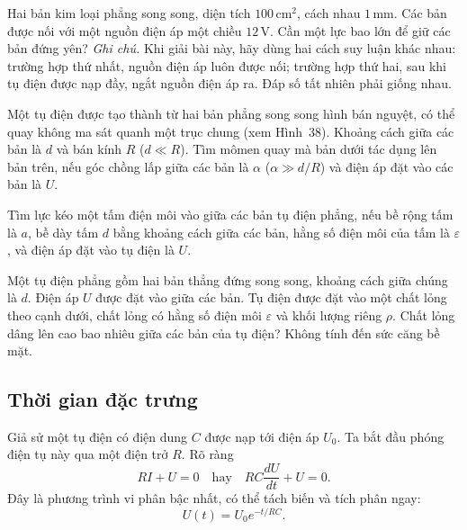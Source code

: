  Hai bản kim loại phẳng song song, diện tích $100\,\mathrm{cm}^2$, cách nhau $1\,\mathrm{mm}$. Các bản được nối với một nguồn điện áp một chiều $12\,\mathrm{V}$. Cần một lực bao lớn để giữ các bản đứng yên? \emph{Ghi chú.} Khi giải bài này, hãy dùng hai cách suy luận khác nhau: trường hợp thứ nhất, nguồn điện áp luôn được nối; trường hợp thứ hai, sau khi tụ điện được nạp đầy, ngắt nguồn điện áp ra. Đáp số tất nhiên phải giống nhau.


 Một tụ điện được tạo thành từ hai bản phẳng song song hình bán nguyệt, có thể quay không ma sát quanh một trục chung (xem Hình~38). Khoảng cách giữa các bản là $d$ và bán kính $R$ ($d \ll R$). Tìm mômen quay mà bản dưới tác dụng lên bản trên, nếu góc chồng lấp giữa các bản là $\alpha$ ($\alpha \gg d/R$) và điện áp đặt vào các bản là $U$.


 Tìm lực kéo một tấm điện môi vào giữa các bản tụ điện phẳng, nếu bề rộng tấm là $a$, bề dày tấm $d$ bằng khoảng cách giữa các bản, hằng số điện môi của tấm là $\varepsilon$, và điện áp đặt vào tụ điện là $U$.


 Một tụ điện phẳng gồm hai bản thẳng đứng song song, khoảng cách giữa chúng là $d$. Điện áp $U$ được đặt vào giữa các bản. Tụ điện được đặt vào một chất lỏng theo cạnh dưới, chất lỏng có hằng số điện môi $\varepsilon$ và khối lượng riêng $\rho$. Chất lỏng dâng lên cao bao nhiêu giữa các bản của tụ điện? Không tính đến sức căng bề mặt.


\subsection{Thời gian đặc trưng}

Giả sử một tụ điện có điện dung $C$ được nạp tới điện áp $U_0$. Ta bắt đầu phóng điện tụ này qua một điện trở $R$. Rõ ràng
\[
RI + U = 0 \quad \text{hay} \quad RC\frac{dU}{dt} + U = 0.
\]
Đây là phương trình vi phân bậc nhất, có thể tách biến và tích phân ngay:
\[
U(t) = U_0 e^{-t/RC}.
\]

